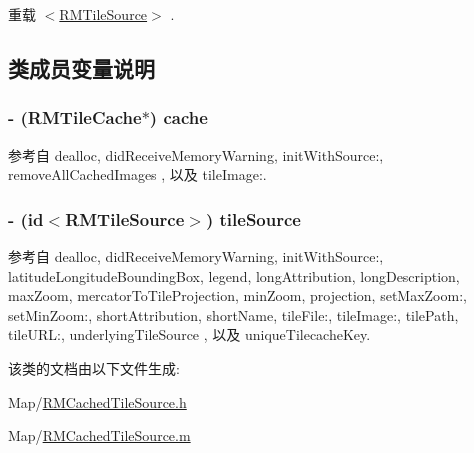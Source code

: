 重载 \hyperlink{protocol_r_m_tile_source-p_a1838a34e9341efe7c76252e131824261}{$<$\-R\-M\-Tile\-Source$>$} .



\subsection{类成员变量说明}
\hypertarget{interface_r_m_cached_tile_source_a6bfbfd532bdc05e0ea95a67db19574fd}{
\subsubsection[{cache}]{\setlength{\rightskip}{0pt plus 5cm}-\/ ({\bf R\-M\-Tile\-Cache}$\ast$) cache\hspace{0.3cm}{\ttfamily [protected]}}}\label{interface_r_m_cached_tile_source_a6bfbfd532bdc05e0ea95a67db19574fd}


参考自 dealloc, did\-Receive\-Memory\-Warning, init\-With\-Source\-:, remove\-All\-Cached\-Images , 以及 tile\-Image\-:.

\hypertarget{interface_r_m_cached_tile_source_a1d18d0de8f4c6bfd360c79e211a07ca9}{
\subsubsection[{tile\-Source}]{\setlength{\rightskip}{0pt plus 5cm}-\/ (id$<${\bf R\-M\-Tile\-Source}$>$) tile\-Source\hspace{0.3cm}{\ttfamily [protected]}}}\label{interface_r_m_cached_tile_source_a1d18d0de8f4c6bfd360c79e211a07ca9}


参考自 dealloc, did\-Receive\-Memory\-Warning, init\-With\-Source\-:, latitude\-Longitude\-Bounding\-Box, legend, long\-Attribution, long\-Description, max\-Zoom, mercator\-To\-Tile\-Projection, min\-Zoom, projection, set\-Max\-Zoom\-:, set\-Min\-Zoom\-:, short\-Attribution, short\-Name, tile\-File\-:, tile\-Image\-:, tile\-Path, tile\-U\-R\-L\-:, underlying\-Tile\-Source , 以及 unique\-Tilecache\-Key.



该类的文档由以下文件生成\-:\begin{DoxyCompactItemize}
\item 
Map/\hyperlink{_r_m_cached_tile_source_8h}{R\-M\-Cached\-Tile\-Source.\-h}\item 
Map/\hyperlink{_r_m_cached_tile_source_8m}{R\-M\-Cached\-Tile\-Source.\-m}\end{DoxyCompactItemize}
